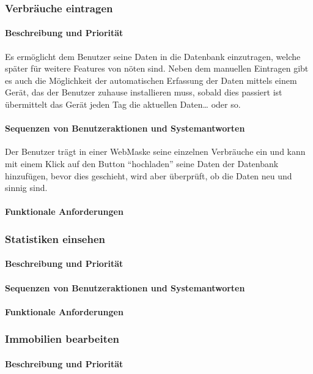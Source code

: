 \subsubsection{Verbräuche eintragen}
\paragraph{Beschreibung und Priorität}
Es ermöglicht dem Benutzer seine Daten in die Datenbank einzutragen, welche später für weitere Features von nöten sind. Neben dem manuellen Eintragen gibt es auch die Möglichkeit der automatischen Erfassung der Daten mittels einem Gerät, das der Benutzer zuhause installieren muss, sobald dies passiert ist übermittelt das Gerät jeden Tag die aktuellen Daten… oder so.

\paragraph{Sequenzen von Benutzeraktionen und Systemantworten}
Der Benutzer trägt in einer WebMaske seine einzelnen Verbräuche ein und kann mit einem Klick auf den Button “hochladen” seine Daten der Datenbank hinzufügen, bevor dies geschieht, wird aber überprüft, ob die Daten neu und sinnig sind.
\paragraph{Funktionale Anforderungen}

\subsubsection{Statistiken einsehen}
\paragraph{Beschreibung und Priorität}
\paragraph{Sequenzen von Benutzeraktionen und Systemantworten}
\paragraph{Funktionale Anforderungen}

\subsubsection{Immobilien bearbeiten}
\paragraph{Beschreibung und Priorität}
